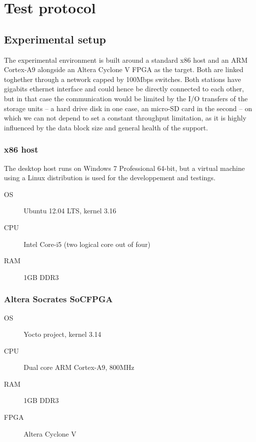 \chapter{Test protocol}\label{chap:test-protocol}

\section{Experimental setup}
The experimental environment is built around a standard x86 host and an ARM Cortex-A9 alongside an Altera Cyclone V FPGA as the target.
Both are linked toghether through a network capped by 100Mbps switches.
Both stations have gigabits ethernet interface and could hence be directly connected to each other, but in that case the communication would be limited by the I/O transfers of the storage units -- a hard drive disk in one case, an micro-SD card in the second -- on which we can not depend to set a constant throughput limitation, as it is highly influenced by the data block size and general health of the support.


\subsection{x86 host}
The desktop host runs on Windows 7 Professional 64-bit, but a virtual machine using a Linux distribution is used for the developpement and testings.

\begin{framed}
\begin{description}
	\item[OS] Ubuntu 12.04 LTS, kernel 3.16
	\item[CPU] Intel Core-i5 (two logical core out of four)
	\item[RAM] 1GB DDR3
\end{description}
\end{framed}

\subsection{Altera Socrates SoCFPGA}

\begin{framed}
\begin{description}
	\item[OS] Yocto project, kernel 3.14
	\item[CPU] Dual core ARM Cortex-A9, 800MHz
	\item[RAM] 1GB DDR3
	\item[FPGA] Altera Cyclone V
\end{description}
\end{framed}

